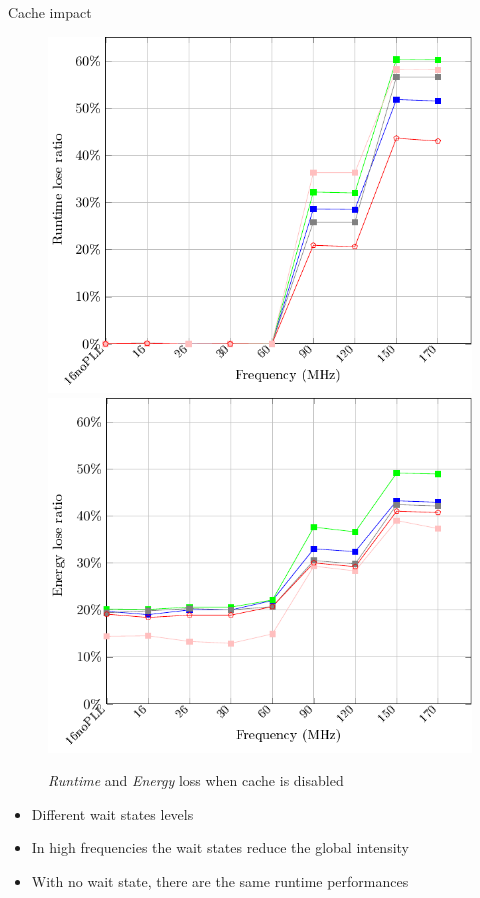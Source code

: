 \documentclass[
	11pt, %
]{beamer}
\begin{document}
\begin{frame}{Cache impact}
	\begin{figure}
		\includegraphics[scale = 0.35]{data/stm32g_v2/cache_impact/duration.pdf}
		\includegraphics[scale = 0.35]{data/stm32g_v2/cache_impact/energy.pdf}
		\caption{\emph{Runtime} and \emph{Energy} loss when cache is disabled}
	\end{figure}
	\begin{itemize}
		\item Different wait states levels
		\item In high frequencies the wait states reduce the global intensity
		\item With no wait state, there are the same runtime performances 
	\end{itemize}
\end{frame}
\end{document}
